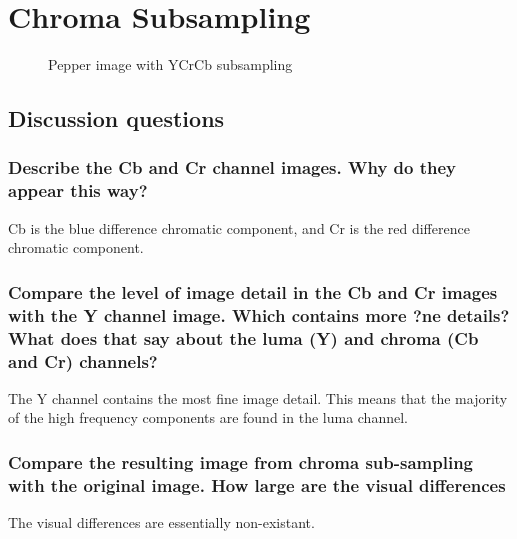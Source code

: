 \section{Chroma Subsampling}


\begin{figure}[ht]
\centering
\end{figure}

\begin{figure}[ht]
\centering
	\caption{Pepper image with YCrCb subsampling}
	\label{fig:noiseGeneration.toy}
\end{figure}
 

\subsection{Discussion questions}

\subsubsection{Describe the Cb and Cr channel images. Why do they appear this way?}
Cb is the blue difference chromatic component, and Cr is the red difference chromatic component.

\subsubsection{Compare the level of image detail in the Cb and Cr images with the Y channel image. Which contains
more ?ne details? What does that say about the luma (Y) and chroma (Cb and Cr) channels?}

The Y channel contains the most fine image detail. This means that the majority of the high frequency components are found in the luma channel.

\subsubsection{Compare the resulting image from chroma sub-sampling with the original image. How large are the
visual differences}
The visual differences are essentially non-existant.


